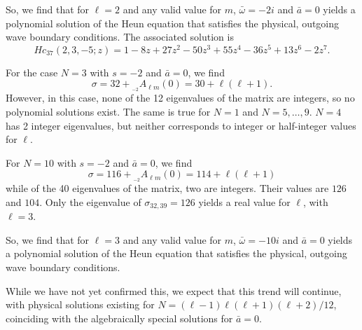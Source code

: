 \documentclass[11pt]{article}
\newcommand{\scA}[4][]{{}_{{}_{#2}}A^{#1}_{#3}(#4)}
\begin{document}
So, we find that for $\ell=2$ and any valid value for $m$,
$\bar\omega=-2i$ and $\bar{a}=0$ yields a polynomial solution of the
Heun equation that satisfies the physical, outgoing wave boundary
conditions.  The associated solution is
\begin{equation}
Hc_{37}(2,3,-5;z) = 1 -8z +27z^2 -50z^3 +55z^4 -36z^5 +13z^6 -2z^7.
\end{equation}

For the case $N=3$ with $s=-2$ and $\bar{a}=0$, we find
\begin{equation}
  \sigma = 32+\scA{-2}{\ell{m}}{0} = 30+\ell(\ell+1).
\end{equation}
However, in this case, none of the 12 eigenvalues of the matrix are
integers, so no polynomial solutions exist.  The same is true for
$N=1$ and $N=5,\ldots,9$.  $N=4$ has 2 integer eigenvalues, but neither
corresponds to integer or half-integer values for $\ell$.

For $N=10$ with $s=-2$ and $\bar{a}=0$, we find 
\begin{equation}
  \sigma = 116+\scA{-2}{\ell{m}}{0} = 114+\ell(\ell+1)
\end{equation}
while of the 40 eigenvalues of the matrix, two are integers.  Their
values are $126$ and $104$.  Only the eigenvalue of $\sigma_{32,39}=126$
yields a real value for $\ell$, with $\ell=3$.

So, we find that for $\ell=3$ and any valid value for $m$,
$\bar\omega=-10i$ and $\bar{a}=0$ yields a polynomial solution of the
Heun equation that satisfies the physical, outgoing wave boundary
conditions.

While we have not yet confirmed this, we expect that this trend will
continue, with physical solutions existing for
$N=(\ell-1)\ell(\ell+1)(\ell+2)/12$, coinciding with the
algebraically special solutions for $\bar{a}=0$.
\end{document}
